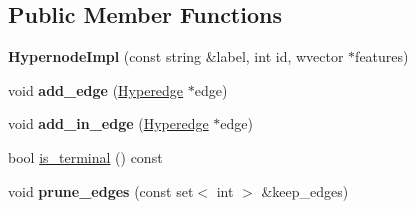 \subsection*{Public Member Functions}
\begin{DoxyCompactItemize}
\item 
\hypertarget{class_scarab_1_1_h_g_1_1_hypernode_impl_a574c6f1386fb27894075977ef1ca56d6}{
{\bfseries HypernodeImpl} (const string \&label, int id, wvector $\ast$features)}
\label{class_scarab_1_1_h_g_1_1_hypernode_impl_a574c6f1386fb27894075977ef1ca56d6}

\item 
\hypertarget{class_scarab_1_1_h_g_1_1_hypernode_impl_a0899a4e97f535c2f005d7c5ab5364681}{
void {\bfseries add\_\-edge} (\hyperlink{class_scarab_1_1_h_g_1_1_hyperedge}{Hyperedge} $\ast$edge)}
\label{class_scarab_1_1_h_g_1_1_hypernode_impl_a0899a4e97f535c2f005d7c5ab5364681}

\item 
\hypertarget{class_scarab_1_1_h_g_1_1_hypernode_impl_ab05500702d5fa1c896efe941f9c54bf3}{
void {\bfseries add\_\-in\_\-edge} (\hyperlink{class_scarab_1_1_h_g_1_1_hyperedge}{Hyperedge} $\ast$edge)}
\label{class_scarab_1_1_h_g_1_1_hypernode_impl_ab05500702d5fa1c896efe941f9c54bf3}

\item 
bool \hyperlink{class_scarab_1_1_h_g_1_1_hypernode_impl_a2bb4b33ff207c3c1babe135b9af6323e}{is\_\-terminal} () const 
\item 
\hypertarget{class_scarab_1_1_h_g_1_1_hypernode_impl_a6675d677bd7e794ae9a8bf72645b828a}{
void {\bfseries prune\_\-edges} (const set$<$ int $>$ \&keep\_\-edges)}
\label{class_scarab_1_1_h_g_1_1_hypernode_impl_a6675d677bd7e794ae9a8bf72645b828a}


\end{DoxyCompactItemize}
